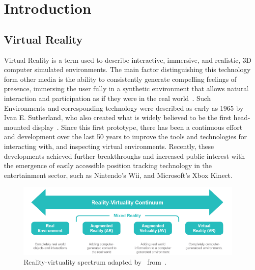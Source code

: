 \chapter{Introduction}\label{ch:introduction}

\section{Virtual Reality}\label{sec:virtual-reality}

Virtual Reality is a term used to describe interactive, immersive, and realistic, 3D computer simulated environments.
The main factor distinguishing this technology form other media is the ability to consistently generate compelling
feelings of presence, immersing the user fully in a synthetic environment that allows natural interaction and
participation as if they were in the real world~\cite{Davis2014}.
Such Environments and corresponding technology were described as early as 1965 by Ivan E. Sutherland, who also created
what is widely believed to be the first head-mounted display~\cite{Sutherland1968}.
Since this first prototype, there has been a continuous effort and development over the last 50 years to improve the
tools and technologies for interacting with, and inspecting virtual environments.
Recently, these developments achieved further breakthroughs and increased public interest with the emergence of
easily accessible position tracking technology in the entertainment sector, such as Nintendo's Wii, and Microsoft's
Xbox Kinect.

\begin{figure}[h]
    \centering
    \includegraphics[width=\textwidth]{content/1_introduction/img/reality-virtuality-continuum[Spivak2015]}
    \caption{Reality-virtuality spectrum adapted by~\cite{Spivak2015} from~\cite{Milgram1994}.}
    \label{fig:environment-spectrum}
\end{figure}

